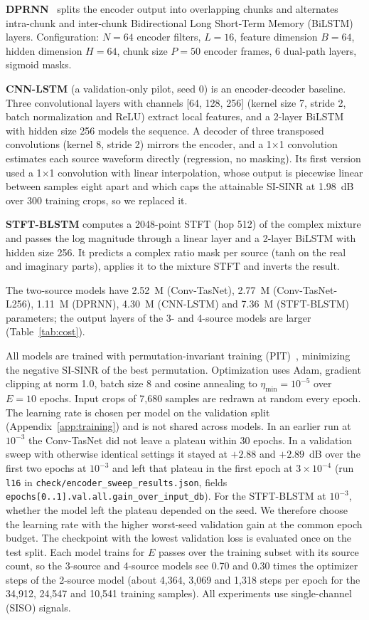 \documentclass[journal]{IEEEtran}
\begin{document}
\textbf{DPRNN}~\cite{luo2020dual} splits the encoder output into
overlapping chunks and alternates intra-chunk and inter-chunk
Bidirectional Long Short-Term Memory (BiLSTM) layers. Configuration: $N\!=\!64$
encoder filters, $L\!=\!16$, feature dimension $B\!=\!64$, hidden
dimension $H\!=\!64$, chunk size $P\!=\!50$ encoder frames, 6 dual-path
layers, sigmoid masks.

\textbf{CNN-LSTM} (a validation-only pilot, seed 0) is an encoder-decoder baseline. Three convolutional layers
with channels [64, 128, 256] (kernel size 7, stride 2, batch normalization and ReLU)
extract local features, and a 2-layer BiLSTM with hidden size 256 models the sequence.
A decoder of three transposed convolutions (kernel 8, stride 2) mirrors the encoder,
and a 1$\times$1 convolution estimates each source waveform directly (regression, no
masking). Its first version used a 1$\times$1 convolution with linear interpolation,
whose output is piecewise linear between samples eight apart and which caps the
attainable SI-SINR at 1.98~dB over 300 training crops, so we replaced it.

\textbf{STFT-BLSTM} computes a 2048-point STFT (hop 512) of the complex mixture and
passes the log magnitude through a linear layer and a 2-layer BiLSTM with hidden size
256. It predicts a complex ratio mask per source (tanh on the real and imaginary
parts), applies it to the mixture STFT and inverts the result.

The two-source models have 2.52~M (Conv-TasNet), 2.77~M (Conv-TasNet-L256), 1.11~M (DPRNN),
4.30~M (CNN-LSTM) and 7.36~M (STFT-BLSTM) parameters; the output layers of the 3- and 4-source models are larger (Table~\ref{tab:cost}).

All models are trained with permutation-invariant training
(PIT)~\cite{kolbaek2017multitalker}, minimizing the negative SI-SINR of the best
permutation. Optimization uses Adam, gradient clipping at norm 1.0, batch size 8 and
cosine annealing to $\eta_{\min}\!=\!10^{-5}$ over $E\!=\!10$ epochs. Input crops of
7,680 samples are redrawn at random every epoch. The learning rate is chosen per
model on the validation split (Appendix~\ref{app:training}) and is not shared across models. In an earlier run at $10^{-3}$ the Conv-TasNet did not leave a plateau within 30 epochs. In
a validation sweep with otherwise identical settings it stayed at $+2.88$ and
$+2.89$~dB over the first two epochs at $10^{-3}$ and left that plateau in the first epoch
at $3\times10^{-4}$ (run \texttt{l16} in \texttt{check/encoder\_sweep\_results.json},
fields \texttt{epochs[0..1].val.all.gain\_over\_input\_db}). For the STFT-BLSTM at $10^{-3}$, whether the model left the plateau
depended on the seed. We therefore choose the learning rate with the higher worst-seed validation
gain at the common epoch budget. The checkpoint with the lowest validation loss is
evaluated once on the test split. Each model trains for $E$ passes over the training subset
with its source count, so the 3-source and 4-source models see 0.70 and 0.30 times the
optimizer steps of the 2-source model (about 4,364, 3,069 and 1,318 steps per epoch for the
34,912, 24,547 and 10,541 training samples). All experiments use single-channel (SISO)
signals.
\end{document}
